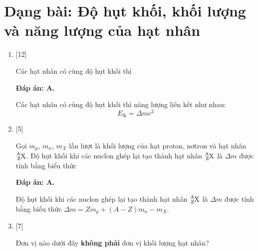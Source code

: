 \section{Dạng bài: Độ hụt khối, khối lượng và năng lượng của hạt nhân}
\begin{enumerate}[label=\bfseries Câu \arabic*:]
	\item {} [12]
	
	\cauhoi
	{Các hạt nhân có cùng độ hụt khối thì
	}
	
	\loigiai
	{		\textbf{Đáp án: A.}
		
		Các hạt nhân có cùng độ hụt khối thì năng lượng liên kết như nhau:
		$$E_\text{lk} = \Delta m c^2$$
		
	}
	
	\item {} [5]
	
	\cauhoi
	{Gọi $m_p$, $m_n$, $m_X$ lần lượt là khối lượng của hạt proton, nơtron và hạt nhân $\ce{^A_Z X}$. Độ hụt khối khi các nuclon ghép lại tạo thành hạt nhân $\ce{^A_Z X}$ là $\Delta m$ được tính bằng biểu thức
	}
	
	\loigiai
	{		\textbf{Đáp án: A.}
		
		Độ hụt khối khi các nuclon ghép lại tạo thành hạt nhân $\ce{^A_Z X}$ là $\Delta m$ được tính bằng biểu thức $\Delta m = Z m_p + (A-Z) m_n - m_X$. 
		
	}
	\item {} [7]

\cauhoi
{Đơn vị nào dưới đây \textbf{không phải} đơn vị khối lượng hạt nhân?
	\begin{mcq}(4)
		\item $\SI{}{kg}$. 
		\item $\SI{}{MeV/c^2}$.
		\item $\SI{}{u}$.
		\item $\SI{}{MeV/c}$.
	\end{mcq}
}


\end{enumerate}

